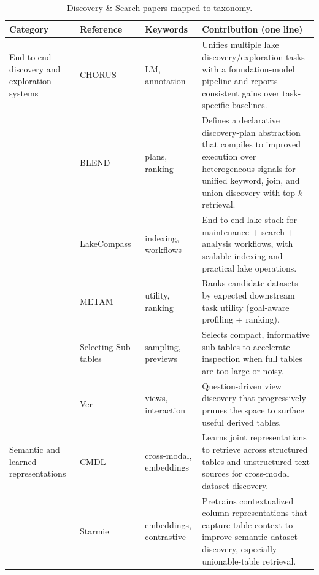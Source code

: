 \documentclass[sigconf]{acmart}
\newcommand{\tbl}{%
  \scriptsize
  \setlength{\tabcolsep}{4pt}%
  \renewcommand{\arraystretch}{1.12}%
}
\begin{document}
\begin{table}[!htbp]
\caption{Discovery \& Search papers mapped to taxonomy.}
\label{tab:discovery-methods}
\tbl
\begin{tabularx}{\textwidth}{@{}p{24mm}p{28mm}p{18mm}Y@{}}
\toprule
\textbf{Category} & \textbf{Reference} & \textbf{Keywords} & \textbf{Contribution (one line)} \\
\midrule

End-to-end discovery and exploration systems &
CHORUS~\cite{10.14778/3659437.3659461} &
LM, annotation &
Unifies multiple lake discovery/exploration tasks with a foundation-model pipeline and reports consistent gains over task-specific baselines. \\

~ &
BLEND~\cite{11112882} &
plans, ranking &
Defines a declarative discovery-plan abstraction that compiles to improved execution over heterogeneous signals for unified keyword, join, and union discovery with top-$k$ retrieval. \\

~ &
LakeCompass~\cite{10.14778/3685800.3685880} &
indexing, workflows &
End-to-end lake stack for maintenance + search + analysis workflows, with scalable indexing and practical lake operations. \\

~ &
METAM~\cite{10184845} &
utility, ranking &
Ranks candidate datasets by expected downstream task utility (goal-aware profiling + ranking). \\

~ &
Selecting Sub-tables~\cite{10184535} &
sampling, previews &
Selects compact, informative sub-tables to accelerate inspection when full tables are too large or noisy. \\

~ &
Ver~\cite{10184768} &
views, interaction &
Question-driven view discovery that progressively prunes the space to surface useful derived tables. \\

\midrule

Semantic and learned representations &
CMDL~\cite{10.14778/3611479.3611533} &
cross-modal, embeddings &
Learns joint representations to retrieve across structured tables and unstructured text sources for cross-modal dataset discovery. \\

~ &
Starmie~\cite{10.14778/3587136.3587146} &
embeddings, contrastive &
Pretrains contextualized column representations that capture table context to improve semantic dataset discovery, especially unionable-table retrieval. \\


\end{tabularx}
\end{table}
\end{document}
